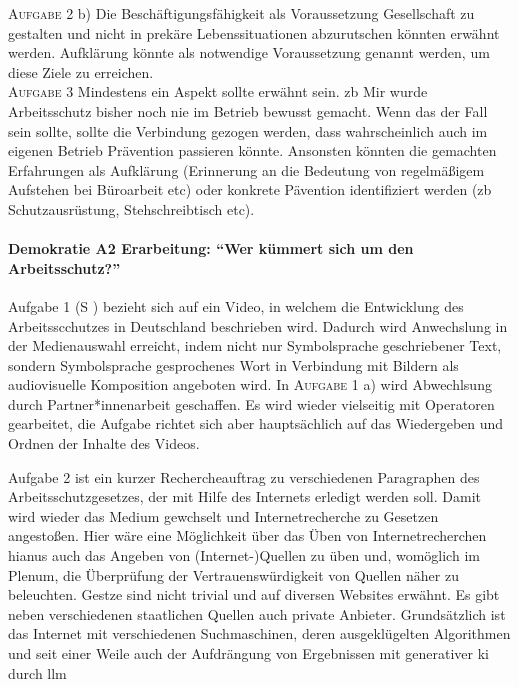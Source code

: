 \textsc{Aufgabe 2} b) \quad
Die Beschäftigungsfähigkeit als Voraussetzung Gesellschaft zu gestalten und nicht in prekäre Lebenssituationen abzurutschen könnten erwähnt werden. 
Aufklärung könnte als notwendige Voraussetzung genannt werden, um diese Ziele zu erreichen.
\\

\textsc{Aufgabe 3} \quad
Mindestens ein Aspekt sollte erwähnt sein. \Gls{zb} Mir wurde Arbeitsschutz bisher noch nie im Betrieb bewusst gemacht.
Wenn das der Fall sein sollte, sollte die Verbindung gezogen werden, dass wahrscheinlich auch im eigenen Betrieb Prävention passieren könnte. 
Ansonsten könnten die gemachten Erfahrungen als Aufklärung (Erinnerung an die Bedeutung von regelmäßigem Aufstehen bei Büroarbeit \gls{etc}) oder konkrete Pävention identifiziert werden (\gls{zb} Schutzausrüstung, Stehschreibtisch \gls{etc}).



\paragraph{Demokratie A2 Erarbeitung: \enquote{Wer kümmert sich um den Arbeitsschutz?}}
Aufgabe 1 (\gls{S} \pageref{DEMOKRATIE-A2}) bezieht sich auf ein Video, in welchem die Entwicklung des Arbeitsscchutzes in Deutschland beschrieben wird. 
Dadurch wird Anwechslung in der Medienauswahl erreicht, indem nicht nur Symbolsprache geschriebener Text, sondern Symbolsprache gesprochenes Wort in Verbindung mit Bildern als audiovisuelle Komposition angeboten wird.
In \textsc{Aufgabe 1} a) wird Abwechlsung durch Partner*innenarbeit geschaffen.
Es wird wieder vielseitig mit Operatoren gearbeitet, die Aufgabe richtet sich aber hauptsächlich auf das Wiedergeben und Ordnen der Inhalte des Videos.

Aufgabe 2 ist ein kurzer Rechercheauftrag zu verschiedenen Paragraphen des Arbeitsschutzgesetzes, der mit Hilfe des Internets erledigt werden soll. Damit wird wieder das Medium gewchselt und Internetrecherche zu Gesetzen angestoßen. 
Hier wäre eine Möglichkeit über das Üben von Internetrecherchen hianus auch das Angeben von (Internet-)Quellen zu üben und, womöglich im Plenum, die Überprüfung der Vertrauenswürdigkeit von Quellen näher zu beleuchten. Gestze sind nicht trivial und auf diversen Websites erwähnt. Es gibt neben verschiedenen staatlichen Quellen auch private Anbieter. Grundsätzlich ist das Internet mit verschiedenen Suchmaschinen, deren ausgeklügelten Algorithmen und seit einer Weile auch der Aufdrängung von Ergebnissen mit generativer \gls{ki} durch \gls{llm} 


